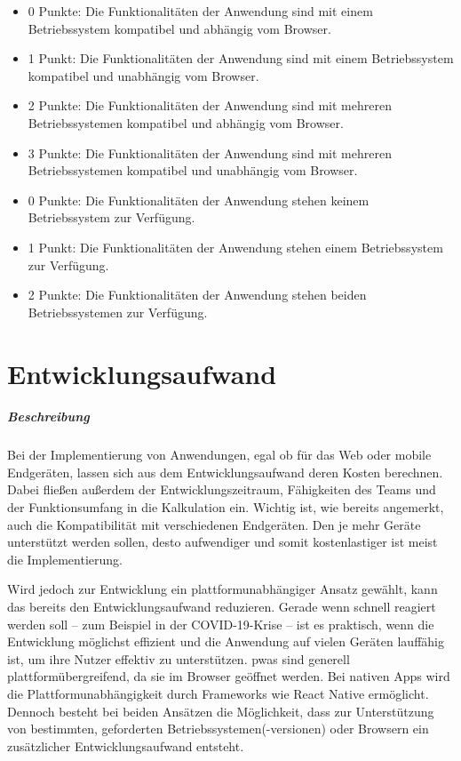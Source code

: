 \begin{itemize}
\item 0 Punkte: Die Funktionalitäten der Anwendung sind mit einem Betriebssystem kompatibel und abhängig vom Browser.
\item 1 Punkt: Die Funktionalitäten der Anwendung sind mit einem Betriebssystem kompatibel und unabhängig vom Browser.
\item 2 Punkte: Die Funktionalitäten der Anwendung sind mit mehreren Betriebssystemen kompatibel und abhängig vom Browser.
\item 3 Punkte: Die Funktionalitäten der Anwendung sind mit mehreren Betriebssystemen kompatibel und unabhängig vom Browser.

\item 0 Punkte: Die Funktionalitäten der Anwendung stehen keinem Betriebssystem zur Verfügung.
\item 1 Punkt: Die Funktionalitäten der Anwendung stehen einem Betriebssystem zur Verfügung.
\item 2 Punkte: Die Funktionalitäten der Anwendung stehen beiden Betriebssystemen zur Verfügung.
\end{itemize}

\section{Entwicklungsaufwand}
\subparagraph{Beschreibung\\}
Bei der Implementierung von Anwendungen, egal ob für das Web oder mobile Endgeräten, lassen sich aus dem Entwicklungsaufwand deren Kosten berechnen.
Dabei fließen außerdem der Entwicklungszeitraum, Fähigkeiten des Teams und der Funktionsumfang in die Kalkulation ein.
Wichtig ist, wie bereits angemerkt, auch die Kompatibilität mit verschiedenen Endgeräten.
Den je mehr Geräte unterstützt werden sollen, desto aufwendiger und somit kostenlastiger ist meist die Implementierung.

Wird jedoch zur Entwicklung ein plattformunabhängiger Ansatz gewählt, kann das bereits den Entwicklungsaufwand reduzieren.
Gerade wenn schnell reagiert werden soll -- zum Beispiel in der COVID-19-Krise -- ist es praktisch, wenn die Entwicklung möglichst effizient und die Anwendung auf vielen Geräten lauffähig ist, um ihre Nutzer effektiv zu unterstützen.
\acp{pwa} sind generell plattformübergreifend, da sie im Browser geöffnet werden.
Bei nativen Apps wird die Plattformunabhängigkeit durch Frameworks wie React Native ermöglicht.
Dennoch besteht bei beiden Ansätzen die Möglichkeit, dass zur Unterstützung von bestimmten, geforderten Betriebssystemen(-versionen) oder Browsern ein zusätzlicher Entwicklungsaufwand entsteht.

